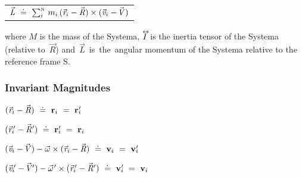 \documentclass[10pt]{article}
\begin{document}
\begin{tabular}{l}
${\vec{\mathit{L}}} ~\doteq~ \sum_i^{\scriptscriptstyle{\mathrm{N}}} \, m_i \, ({\vec{\mathit{r}}_{i}} - {\vec{\mathit{R}}}) \times ({\vec{\mathit{v}}_{i}} - \hspace{-0.120em}{\vec{\mathit{V}}})$
\end{tabular}

\par \bigskip \noindent where ${\mathit{M}}$ is the mass of the Systema, ${\mathit{I}}{\vphantom{\sum_1^2}}^{\hspace{-0.555em}\leftrightarrow}\hspace{-0.300em}$ is the inertia tensor of the Systema (relative \hbox {to ${\vec{\mathit{R}}}$)} \hbox {and ${\vec{\mathit{L}}}$ is the angular} momentum of the Systema relative to the reference frame S.

\vspace{+1.80em}

\par {\centering\subsubsection*{Invariant Magnitudes}}\hypertarget{a1p2}{}

\par \bigskip\medskip \hspace{-1.80em} $({\vec{\mathit{r}}}_i - {\vec{\mathit{R}}}) ~\doteq~ {\mathbf{r}}_i ~=~ {\mathbf{r}}_i\hspace{-0.300em}'$

\par \bigskip \hspace{-1.80em} $({\vec{\mathit{r}}}_i\hspace{-0.150em}' - {\vec{\mathit{R}}}\hspace{+0.015em}') ~\doteq~ {\mathbf{r}}_i\hspace{-0.300em}' ~=~ {\mathbf{r}}_i$

\par \bigskip \hspace{-1.80em} $({\vec{\mathit{v}}}_i - \hspace{-0.120em}{\vec{\mathit{V}}}) - {\vec{\omega}} \times ({\vec{\mathit{r}}}_i - {\vec{\mathit{R}}}) ~\doteq~ {\mathbf{v}}_i ~=~ {\mathbf{v}}_i\hspace{-0.300em}'$

\par \bigskip \hspace{-1.80em} $({\vec{\mathit{v}}}_i\hspace{-0.150em}' - \hspace{-0.120em}{\vec{\mathit{V}}}\hspace{-0.045em}') - {\vec{\omega}}\hspace{+0.060em}' \times ({\vec{\mathit{r}}}_i\hspace{-0.150em}' - {\vec{\mathit{R}}}\hspace{+0.015em}') ~\doteq~ {\mathbf{v}}_i\hspace{-0.300em}' ~=~ {\mathbf{v}}_i$
\end{document}
